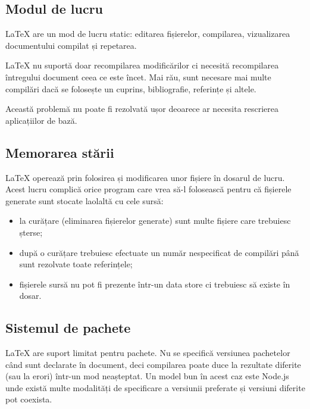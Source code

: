 \documentclass[a4wide,12pt]{report}
\newcommand{\eng}[1]{{#1}} %
\begin{document}
\subsection{Modul de lucru}

\LaTeX{} are un mod de lucru static: editarea fișierelor, compilarea,
vizualizarea documentului compilat și repetarea.

\LaTeX{} nu suportă doar recompilarea modificărilor ci necesită recompilarea
întregului document ceea ce este încet. Mai rău, sunt necesare mai multe
compilări dacă se folosește un cuprins, bibliografie, referințe și altele.

Această problemă nu poate fi rezolvată ușor deoarece ar necesita rescrierea
aplicațiilor de bază.

\subsection{Memorarea stării}
\label{memstasub}

\LaTeX{} operează prin folosirea și modificarea unor fișiere în dosarul de
lucru. Acest lucru complică orice program care vrea să-l folosească pentru că
fișierele generate sunt stocate laolaltă cu cele sursă:

\begin{itemize}

\item la curățare (eliminarea fișierelor generate) sunt multe fișiere care
trebuiesc șterse;

\item după o curățare trebuiesc efectuate un număr nespecificat de compilări
până sunt rezolvate toate referințele;

\item fișierele sursă nu pot fi prezente într-un \eng{data store} ci trebuiesc
să existe în dosar.

\end{itemize}

\subsection{Sistemul de pachete}

\LaTeX{} are suport limitat pentru pachete. Nu se specifică versiunea pachetelor
când sunt declarate în document, deci compilarea poate duce la rezultate
diferite (sau la erori) într-un mod neașteptat. Un model bun în acest caz
este Node.js unde există multe modalități de specificare a versiunii preferate
și versiuni diferite pot coexista.
\end{document}
